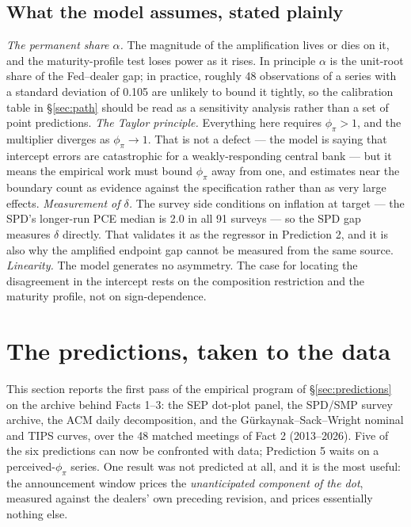 \documentclass[11pt]{article}
\begin{document}
\subsection{What the model assumes, stated plainly}
\emph{The permanent share $\alpha$.} The magnitude of the amplification lives or dies on it,
and the maturity-profile test loses power as it rises. In principle $\alpha$ is the unit-root
share of the Fed--dealer gap; in practice, roughly 48 observations of a series with a standard
deviation of 0.105 are unlikely to bound it tightly, so the calibration table in
\S\ref{sec:path} should be read as a sensitivity analysis rather than a set of point
predictions.
\emph{The Taylor principle.} Everything here requires $\phi_\pi>1$, and the multiplier diverges
as $\phi_\pi\to1$. That is not a defect --- the model is saying that intercept errors are
catastrophic for a weakly-responding central bank --- but it means the empirical work must bound
$\phi_\pi$ away from one, and estimates near the boundary count as evidence against the
specification rather than as very large effects.
\emph{Measurement of $\delta$.} The survey side conditions on inflation at target --- the SPD's
longer-run PCE median is 2.0 in all 91 surveys --- so the SPD gap measures $\delta$ directly.
That validates it as the regressor in Prediction 2, and it is also why the amplified endpoint
gap cannot be measured from the same source.
\emph{Linearity.} The model generates no asymmetry. The case for locating the disagreement in
the intercept rests on the composition restriction and the maturity profile, not on
sign-dependence.
\clearpage
\section{The predictions, taken to the data}
\label{sec:tests}
This section reports the first pass of the empirical program of
\S\ref{sec:predictions} on the archive behind Facts 1--3: the SEP dot-plot
panel, the SPD/SMP survey archive, the ACM daily decomposition, and the
G\"urkaynak--Sack--Wright nominal and TIPS curves, over the 48 matched meetings
of Fact 2 (2013--2026). Five of the six predictions can now be confronted with
data; Prediction 5 waits on a perceived-$\phi_\pi$ series. One result was not
predicted at all, and it is the most useful: the announcement window prices the
\emph{unanticipated component of the dot}, measured against the dealers' own
preceding revision, and prices essentially nothing else.
\end{document}
